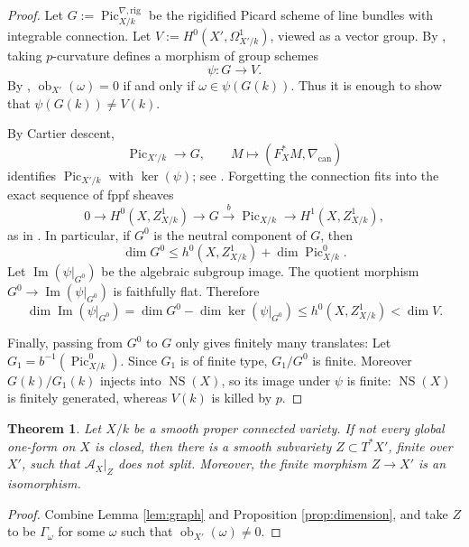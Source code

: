 \documentclass[10pt,a4paper]{amsart}
\newtheorem{theorem}{Theorem}
\DeclareMathOperator{\Pic}{Pic}
\DeclareMathOperator{\NS}{NS}
\begin{document}
\begin{proof}
Let \(G:=\Pic^{\nabla,\mathrm{rig}}_{X/k}\)
be the rigidified Picard scheme of line bundles with integrable
connection.  Let \(V:=H^0(X',\Omega^1_{X'/k})\), viewed as a vector group.
By \cite[Proposition 4.11 and the paragraph following it]{OV}, taking \(p\)-curvature defines a morphism of group schemes
\[
\psi\colon G\longrightarrow V.
\]
By \cite[Proposition 4.2]{OV}, \(\operatorname{ob}_{X'}(\omega)=0\) if and only if \(\omega\in\psi(G(k))\).  Thus it is enough to show that
\(\psi(G(k))\ne V(k)\).

By Cartier descent,
\[
\Pic_{X'/k}\longrightarrow G,\qquad
M\longmapsto (F_X^*M,\nabla_{\mathrm{can}})
\]
identifies \(\Pic_{X'/k}\) with \(\ker(\psi)\); see \cite[Theorem 5.1]{Katz}.
Forgetting the connection fits into the exact sequence of fppf sheaves
\begin{equation*}
0\to H^0(X,Z^1_{X/k})\to G\xrightarrow{b}\Pic_{X/k}
\to H^1(X,Z^1_{X/k}),
\end{equation*}
as in \cite[Proposition 4.11]{OV}.  In particular, if \(G^0\) is the neutral
component of \(G\), then
\[
\dim G^0\leq h^0(X,Z^1_{X/k})+\dim \Pic^0_{X/k}.
\]
Let \(\operatorname{Im}(\psi|_{G^0})\) be the algebraic subgroup image.
The quotient morphism \(G^0\to \operatorname{Im}(\psi|_{G^0})\) is 
faithfully flat. Therefore
\[
\dim \operatorname{Im}(\psi|_{G^0})=\dim G^0-\dim\ker(\psi|_{G^0})
\leq h^0(X,Z^1_{X/k})<\dim V.
\]


Finally, passing from \(G^0\) to \(G\) only gives finitely many translates:
Let \(G_1=b^{-1}(\Pic^0_{X/k})\).  Since \(G_1\) is of finite type,
\(G_1/G^0\) is finite.  Moreover \(G(k)/G_1(k)\) injects into \(\NS(X)\), so
its image under \(\psi\) is finite: \(\NS(X)\) is finitely generated, whereas
\(V(k)\) is killed by \(p\).

\end{proof}


\begin{theorem}
    Let $X/k$ be a smooth proper connected variety.
    If not every global one-form on $X$ is closed, then there is a smooth subvariety $Z\subset T^*X'$, finite over $X'$, such that $\mathcal{A}_X|_Z$ does not split. Moreover, the finite morphism $Z\to X'$ is an isomorphism.
\end{theorem}

\begin{proof}
    Combine Lemma \ref{lem:graph} and Proposition \ref{prop:dimension}, and take $Z$ to be $\Gamma_{\omega}$ for some $\omega$ such that $\operatorname{ob}_{X'}(\omega)\neq 0$.
\end{proof}
\end{document}
